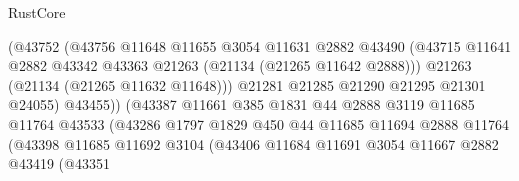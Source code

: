 \begin{lexlean}{RustCore}
\begin{coremodule}
                                      (@43752
                                        (@43756
                                          @11648
                                          @11655
                                          @3054
                                          @11631
                                          @2882
                                          @43490
                                          (@43715
                                            @11641
                                            @2882
                                            @43342
                                            @43363
                                            @21263
                                            (@21134 (@21265 @11642 @2888)))
                                          @21263
                                          (@21134 (@21265 @11632 @11648)))
                                        @21281
                                        @21285
                                        @21290
                                        @21295
                                        @21301
                                        @24055)
                                      @43455))
                                  (@43387
                                    @11661
                                    @385
                                    @1831
                                    @44
                                    @2888
                                    @3119
                                    @11685
                                    @11764
                                    @43533
                                    (@43286
                                      @1797
                                      @1829
                                      @450
                                      @44
                                      @11685
                                      @11694
                                      @2888
                                      @11764
                                      (@43398
                                        @11685
                                        @11692
                                        @3104
                                        (@43406
                                          @11684
                                          @11691
                                          @3054
                                          @11667
                                          @2882
                                          @43419
                                          (@43351

\end{coremodule}
\end{lexlean}
